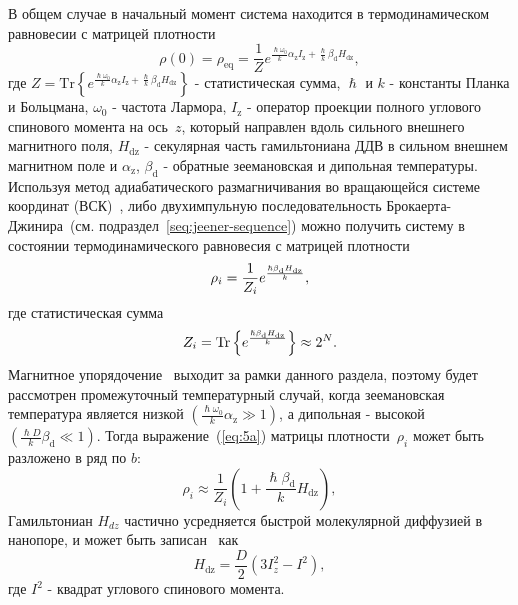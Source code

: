 В общем случае в начальный момент система находится в термодинамическом равновесии с матрицей плотности
%
\begin{equation}\label{eq:4}
    \rho(0) = \rho_\mathrm{eq} = \dfrac{1}{Z}
    e^{
      \frac{\hslash \omega_{0}}{k} \alpha_\mathrm{z} I_\mathrm{z}
      + \frac{\hslash }{k} \beta_\mathrm{d} H_\mathrm{dz}
    },
\end{equation}
%
где
$Z = \mathrm{Tr} \left\{ e^{\frac{\hslash \omega_{0}}{k} \alpha_\mathrm{z} I_\mathrm{z} + \frac{\hslash }{k} \beta_\mathrm{d} H_\mathrm{dz}} \right\}$ - статистическая сумма,
$\hslash$ и $k$ - константы Планка и Больцмана,
$\omega_{0}$ - частота Лармора,
$I_\mathrm{z}$ -  оператор проекции полного углового спинового момента  на ось~$z$,
который направлен вдоль сильного внешнего магнитного поля,
$H_\mathrm{dz}$ - секулярная часть гамильтониана ДДВ в сильном внешнем магнитном поле
и $\alpha_\mathrm{z}$, $\beta_\mathrm{d}$ - обратные зеемановская и дипольная температуры.
%
Используя  метод адиабатического размагничивания во вращающейся системе координат (ВСК)~\cite{Goldman1970, Slichter1961},
либо двухимпульную последовательность Брокаерта-Джинира~(см. подраздел~\ref{seq:jeener-sequence})
можно получить систему в состоянии термодинамического равновесия с матрицей плотности
%
\begin{equation}\label{eq:5a}
  \rho_i = \frac{1}{Z_i} e^\frac{\hslash\beta_\mathrm{d} H_\mathrm{dz}}{k},
\end{equation}
%
где статистическая сумма
%
\begin{equation}\label{eq:6}
  Z_i = \mathrm{Tr} \left\{ e^\frac{\hslash\beta_\mathrm{d} H_\mathrm{dz}}{k} \right\} \approx 2^{N}.
\end{equation}
%
Магнитное упорядочение~\cite{Abragam1982} выходит за рамки данного раздела,
поэтому будет рассмотрен промежуточный температурный случай,
когда зеемановская температура является низкой $({\frac{\hslash \omega_{0}}{k} \alpha_\mathrm{z}}\gg 1)$,
а дипольная - высокой $\left( \frac{\hslash{D}}{k}\beta_\mathrm{d} \ll 1\right)$.
Тогда выражение~(\ref{eq:5a}) матрицы плотности~$\rho_i$ может быть разложено в ряд по $b$:
%
\begin{equation}\label{eq:5}
  \rho_i \approx \frac{1}{Z_i}(1 + \frac{\hslash\beta_\mathrm{d}}{k} H_\mathrm{dz}),
\end{equation}
%
Гамильтониан $H_{dz}$ частично усредняется быстрой молекулярной диффузией в нанопоре,
и может быть записан~\cite{Feldman2004,Doronin2011} как
%
\begin{equation}
  \label{eq:7}
  H_\mathrm{dz} = \dfrac{D}{2} (3 I^{2}_{z} - I^{2}) , %
\end{equation}
%
где $I^{2}$ - квадрат углового спинового  момента.


